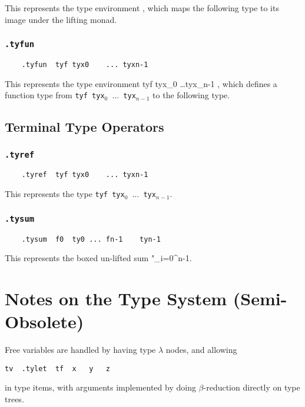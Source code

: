 \documentclass{report}
\newcommand\stringcode[1]{\texttt{#1}}
\begin{document}
This represents the type environment \<\lfloor\bullet\rfloor\>, which maps the following type to its image under the lifting monad.

\subsection{\stringcode{.tyfun}}

\begin{verbatim}
	.tyfun	tyf	tyx0	...	tyxn-1
\end{verbatim}

This represents the type environment \<tyf tyx_0 \ldots tyx_{n-1} \to \bullet\>,
which defines a function type from \stringcode{tyf tyx$_0$ $\ldots$ tyx$_{n-1}$} to the following type.

\section{Terminal Type Operators}
\label{type_terminal}

\subsection{\stringcode{.tyref}}

\begin{verbatim}
	.tyref	tyf	tyx0	...	tyxn-1
\end{verbatim}

This represents the type \stringcode{tyf tyx$_0$ $\ldots$ tyx$_{n-1}$}.

\subsection{\stringcode{.tysum}}

\begin{verbatim}
	.tysum	f0	ty0	...	fn-1	tyn-1
\end{verbatim}

This represents the boxed un-lifted sum \<"\prod\left\langle{}_{i=0}^{n-1}\right\rangle\>.

\chapter{Notes on the Type System (Semi-Obsolete)}

Free variables are handled by having type $\lambda$ nodes, and allowing
\begin{verbatim}
tv	.tylet	tf	x	y	z
\end{verbatim}
in type items, with arguments implemented by doing $\beta$-reduction directly on type trees.
\end{document}
